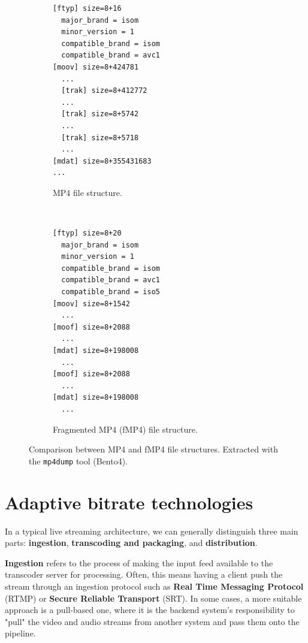 \begin{figure}
	\centering
	
	\begin{subfigure}[t]{0.45\textwidth}
		\centering
		\begin{verbatim}
[ftyp] size=8+16
  major_brand = isom
  minor_version = 1
  compatible_brand = isom
  compatible_brand = avc1
[moov] size=8+424781
  ...
  [trak] size=8+412772
  ...
  [trak] size=8+5742
  ...
  [trak] size=8+5718
  ...
[mdat] size=8+355431683
...
		\end{verbatim}
		\caption{MP4 file structure.}
		\label{fig:mp4dump_progressive}
	\end{subfigure}%
	~ 
	\begin{subfigure}[t]{0.45\textwidth}
		\centering
		\begin{verbatim}
[ftyp] size=8+20
  major_brand = isom
  minor_version = 1
  compatible_brand = isom
  compatible_brand = avc1
  compatible_brand = iso5
[moov] size=8+1542
  ...
[moof] size=8+2088
  ...
[mdat] size=8+198008
  ...
[moof] size=8+2088
  ...
[mdat] size=8+198008
  ...
		\end{verbatim}
		\caption{Fragmented MP4 (fMP4) file structure.}
		\label{fig:mp4dump_fragmented}
	\end{subfigure}
	
	\caption{Comparison between MP4 and fMP4 file structures. Extracted with the \texttt{mp4dump} tool (Bento4).}
	\label{fig:mp4dump}
\end{figure}


\section{Adaptive bitrate technologies}
\label{sec:bg/abr}

In a typical live streaming architecture, we can generally distinguish three main parts: \textbf{ingestion}, \textbf{transcoding and packaging}, and \textbf{distribution}.

\textbf{Ingestion} refers to the process of making the input feed available to the transcoder server for processing. Often, this means having a client push the stream through an ingestion protocol such as \textbf{Real Time Messaging Protocol} (RTMP) or \textbf{Secure Reliable Transport} (SRT). In some cases, a more suitable approach is a pull-based one, where it is the backend system's responsibility to "pull" the video and audio streams from another system and pass them onto the pipeline.

